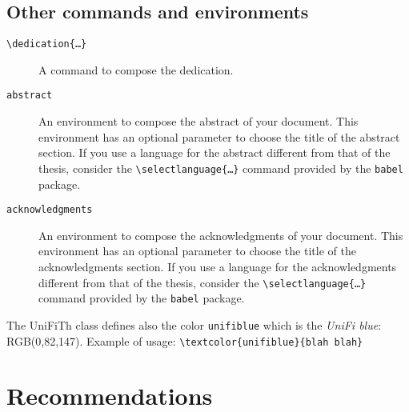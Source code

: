 \documentclass[a5paper,11pt]{article}
\newcommand{\bs}{\textbackslash}
\begin{document}
\subsection[Other commands\\ and environments]{Other commands and environments}

\begin{description}

\item[\texttt{\bs dedication\{\dots\}}] A command to compose the dedication.

\item[\texttt{abstract}] An environment to compose the abstract of your document. This environment has an optional parameter to choose the title of the abstract section.
If you use a language for the abstract different from that of the thesis, consider the \texttt{\bs selectlanguage\{\dots\}} command provided by the \texttt{babel} package.

\item[\texttt{acknowledgments}] An environment to compose the acknowledgments of your document. This environment has an optional parameter to choose the title of the acknowledgments section.
If you use a language for the acknowledgments different from that of the thesis, consider the \texttt{\bs selectlanguage\{\dots\}} command provided by the \texttt{babel} package.


\end{description}

The \textsf{UniFiTh} class defines also the color \texttt{unifiblue} which is the \emph{UniFi blue}: RGB(0,82,147).
Example of usage: \texttt{\bs textcolor\{unifiblue\}\{blah blah\}}


\section{Recommendations}
\end{document}
